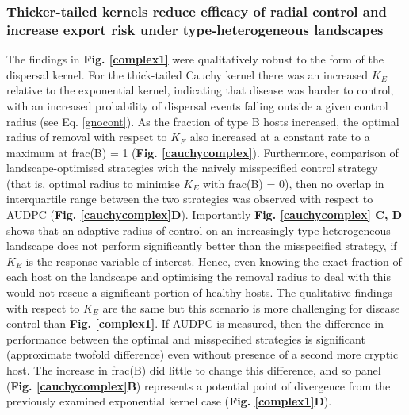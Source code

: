 \documentclass[11pt,letterpaper]{article}
\begin{document}
\FloatBarrier

  \subsubsection*{Thicker-tailed kernels reduce efficacy of radial control and increase export risk under type-heterogeneous landscapes}
 
 The findings in \textbf{Fig. \ref{complex1}} were qualitatively robust to the form of the dispersal kernel. For the thick-tailed Cauchy kernel there was an increased $K_E$ relative to the exponential kernel, indicating that disease was harder to control, with an increased probability of dispersal events falling outside a given  control radius (see Eq. \ref{gnocont}). As the fraction of type B hosts increased, the optimal radius of removal with respect to $K_E$ also increased at a constant rate to a maximum at frac(B) = 1 (\textbf{Fig. {\ref{cauchycomplex}}}). Furthermore, comparison of landscape-optimised strategies with the naively misspecified control strategy (that is, optimal radius to minimise $K_E$ with frac(B) = 0), then no overlap in interquartile range between the two strategies was observed with respect to AUDPC (\textbf{Fig. \ref{cauchycomplex}D}). Importantly \textbf{Fig. \ref{cauchycomplex} C, D} shows that an adaptive radius of control on an increasingly type-heterogeneous landscape does not perform significantly better than the misspecified strategy, if $K_E$ is the response variable of interest. Hence, even knowing the exact fraction of each host on the landscape and optimising the removal radius to deal with this would not rescue a significant portion of healthy hosts. The qualitative findings with respect to $K_E$ are the same but this scenario is more challenging for disease control than \textbf{Fig. \ref{complex1}}. If AUDPC is measured, then the difference in performance between the optimal and misspecified strategies is significant (approximate twofold difference) even without presence of a second more cryptic host. The increase in frac(B) did little to change this difference, and so panel (\textbf{Fig. \ref{cauchycomplex}B}) represents a potential point of divergence from the previously examined exponential kernel case (\textbf{Fig. \ref{complex1}D}).
 
\end{document}
